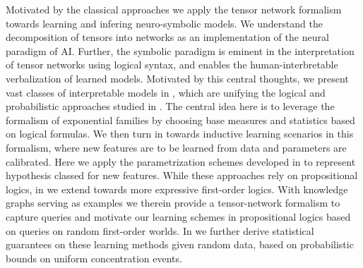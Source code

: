 
Motivated by the classical approaches we apply the tensor network formalism towards learning and infering neuro-symbolic models.
We understand the decomposition of tensors into networks as an implementation of the neural paradigm of AI.
Further, the symbolic paradigm is eminent in the interpretation of tensor networks using logical syntax, and enables the human-interbretable verbalization of learned models.
Motivated by this central thoughts, we present vast classes of interpretable models in , which are unifying the logical and probabilistic approaches studied in .
The central idea here is to leverage the formalism of exponential families by choosing base measures and statistics based on logical formulas.
We then turn in  towards inductive learning scenarios in this formalism, where new features are to be learned from data and parameters are calibrated.
Here we apply the parametrization schemes developed in  to represent hypothesis classed for new features.
While these approaches rely on propositional logics, in  we extend towards more expressive first-order logics.
With knowledge graphs serving as examples we therein provide a tensor-network formalism to capture queries and motivate our learning schemes in propositional logics based on queries on random first-order worlds.
In  we further derive statistical guarantees on these learning methods given random data, based on probabilistic bounds on uniform concentration events.

